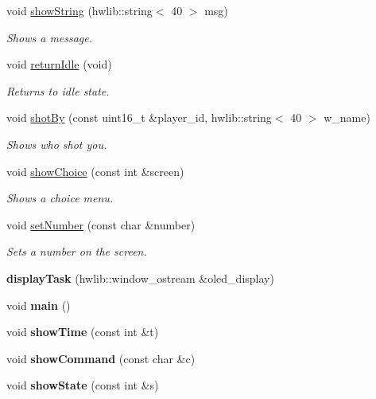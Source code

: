 \begin{DoxyCompactItemize}
void \mbox{\hyperlink{classdisplay_task_acccd3bfbaa4ad2b4c93ad229da70c531}{show\+String}} (hwlib\+::string$<$ 40 $>$ msg)
\begin{DoxyCompactList}\small\item\em Shows a message. \end{DoxyCompactList}\item 
void \mbox{\hyperlink{classdisplay_task_a67990960198f75d5a9815dc4e5a9e375}{return\+Idle}} (void)
\begin{DoxyCompactList}\small\item\em Returns to idle state. \end{DoxyCompactList}\item 
void \mbox{\hyperlink{classdisplay_task_ab9aebca5a9d98bfb5c7fafe5b25ed2c4}{shot\+By}} (const uint16\+\_\+t \&player\+\_\+id, hwlib\+::string$<$ 40 $>$ w\+\_\+name)
\begin{DoxyCompactList}\small\item\em Shows who shot you. \end{DoxyCompactList}\item 
void \mbox{\hyperlink{classdisplay_task_ad34fd92a96e6aa1017db7a6af2ca2125}{show\+Choice}} (const int \&screen)
\begin{DoxyCompactList}\small\item\em Shows a choice menu. \end{DoxyCompactList}\item 
void \mbox{\hyperlink{classdisplay_task_ae47b5facd84033ed17a473e40d67e838}{set\+Number}} (const char \&number)
\begin{DoxyCompactList}\small\item\em Sets a number on the screen. \end{DoxyCompactList}\item 
\mbox{\label{classdisplay_task_ac381d382075cc9257f2169e1338a2501}} 
{\bfseries display\+Task} (hwlib\+::window\+\_\+ostream \&oled\+\_\+display)
\item 
\mbox{\label{classdisplay_task_a08c7eab7bef446ebac2bc1653e4f1227}} 
void {\bfseries main} ()
\item 
\mbox{\label{classdisplay_task_a893409edcd5df80efc7f199c7cd9c697}} 
void {\bfseries show\+Time} (const int \&t)
\item 
\mbox{\label{classdisplay_task_a00a8fbd798e3b50ab4868ae288da296f}} 
void {\bfseries show\+Command} (const char \&c)
\item 
\mbox{\label{classdisplay_task_a93807cbd6151cce058e3a86cb023a1e7}} 
void {\bfseries show\+State} (const int \&s)
\end{DoxyCompactItemize}


